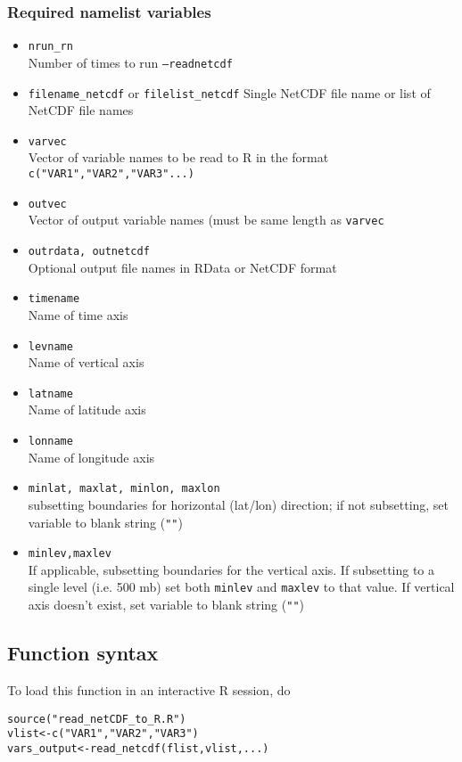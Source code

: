 \documentclass{article}
\begin{document}
\subsubsection{Required namelist variables}
\begin{itemize}
\item[] \texttt{nrun\_rn}\\ Number of times to run \texttt{--readnetcdf}
\item[] \texttt{filename\_netcdf} or \texttt{filelist\_netcdf} Single NetCDF file name or list of NetCDF file names
\item[] \texttt{varvec}\\ Vector of variable names to be read to R in the format \texttt{c("VAR1","VAR2","VAR3"...)}
\item[] \texttt{outvec}\\ Vector of output variable names (must be same length as \texttt{varvec}
\item[] \texttt{outrdata, outnetcdf}\\ Optional output file names in RData or NetCDF format
\item[] \texttt{timename}\\Name of time axis
\item[] \texttt{levname}\\Name of vertical axis
\item[] \texttt{latname}\\Name of latitude axis
\item[] \texttt{lonname} \\Name of longitude axis
\item[] \texttt{minlat, maxlat, minlon, maxlon} \\ subsetting boundaries for horizontal (lat/lon) direction; if not subsetting, set variable to blank string (\texttt{""})
\item[] \texttt{minlev,maxlev}\\ If applicable, subsetting boundaries for the vertical axis. If subsetting to a single level (i.e. 500 mb) set both \texttt{minlev} and \texttt{maxlev} to that value. If vertical axis doesn't exist, set variable to blank string (\texttt{""})
\end{itemize}

\subsection{Function syntax}

To load this function in an interactive R session, do\begin{verbatim}
source("read_netCDF_to_R.R")
vlist<-c("VAR1","VAR2","VAR3")
vars_output<-read_netcdf(flist,vlist,...)
\end{verbatim}
\end{document}
